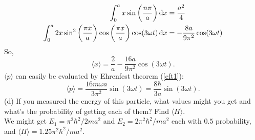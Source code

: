 \begin{wex}
\begin{subequations}
\begin{align}
\int^a_0 x\sin\left(\frac{n\pi}{a}\right)\dx&=\frac{a^2}{4}\\
\int^a_0 2x\sin^2\left(\frac{\pi x}{a}\right)\cos\left(\frac{\pi x}{a}\right)\cos(3\omega t)\dx&=-\frac{8a}{9\pi^2}\cos(3\omega t)
\end{align}
\end{subequations}
So,
\begin{equation}
\langle x\rangle=\frac{2}{a}-\frac{16a}{9\pi^2}\cos(3\omega t).
\end{equation}
$\langle p\rangle$ can easily be evaluated by Ehrenfest theorem (\cref{eft1}):
\begin{equation}
\langle p\rangle=\frac{16m\omega a}{3\pi^2}\sin(3\omega t)=\frac{8\hbar}{3a}\sin(3\omega t).
\end{equation}
(d) If you measured the energy of this particle, what values might you get and what's the probability of getting each of them? Find $\langle H\rangle$.
\ \\
We might get $E_1=\pi^2\hbar^2/2ma^2$ and $E_2=2\pi^2\hbar^2/ma^2$ each with $0.5$ probability, and $\langle H\rangle=1.25\pi^2\hbar^2/ma^2$.
\end{wex}
